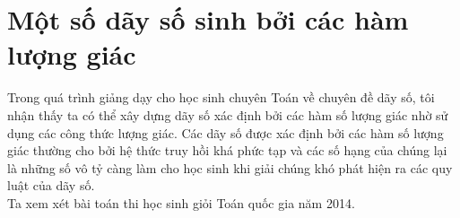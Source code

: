 \section{Một số dãy số sinh bởi các hàm lượng giác}
\begin{center}
	\textbf{\color{violet}{Trương Ngọc Đắc-Trường THPT Chuyên Lê Quý Đôn, Bình Định}}
\end{center}
\noindent Trong quá trình giảng dạy cho học sinh chuyên Toán về chuyên đề dãy số, tôi nhận thấy ta có thể xây dựng dãy số xác định bởi các hàm số lượng giác nhờ sử dụng các công thức lượng giác.
Các dãy số được xác định bởi các hàm số lượng giác thường cho bởi hệ thức truy hồi khá phức tạp và các số hạng của chúng lại là những số vô tỷ càng làm cho học sinh khi giải chúng khó phát hiện ra các quy luật của dãy số.\\
\indent Ta xem xét bài toán thi học sinh giỏi Toán quốc gia năm 2014.

